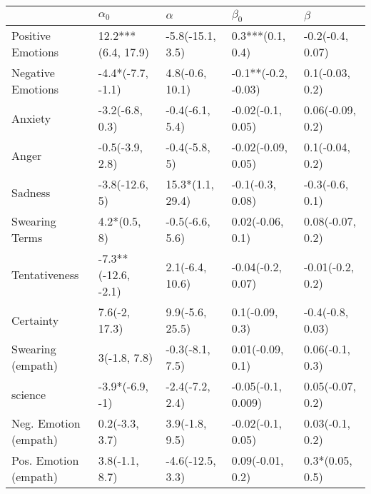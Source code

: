 \begin{tabular}{lllll}
\toprule
{} &           $\alpha_0$ &          $\alpha$ &            $\beta_0$ &           $\beta$ \\
\midrule
Positive Emotions     &   12.2***(6.4, 17.9) &  -5.8(-15.1, 3.5) &     0.3***(0.1, 0.4) &  -0.2(-0.4, 0.07) \\
Negative Emotions     &    -4.4*(-7.7, -1.1) &   4.8(-0.6, 10.1) &  -0.1**(-0.2, -0.03) &   0.1(-0.03, 0.2) \\
Anxiety               &      -3.2(-6.8, 0.3) &   -0.4(-6.1, 5.4) &    -0.02(-0.1, 0.05) &  0.06(-0.09, 0.2) \\
Anger                 &      -0.5(-3.9, 2.8) &     -0.4(-5.8, 5) &   -0.02(-0.09, 0.05) &   0.1(-0.04, 0.2) \\
Sadness               &       -3.8(-12.6, 5) &  15.3*(1.1, 29.4) &     -0.1(-0.3, 0.08) &   -0.3(-0.6, 0.1) \\
Swearing Terms        &         4.2*(0.5, 8) &   -0.5(-6.6, 5.6) &     0.02(-0.06, 0.1) &  0.08(-0.07, 0.2) \\
Tentativeness         &  -7.3**(-12.6, -2.1) &   2.1(-6.4, 10.6) &    -0.04(-0.2, 0.07) &  -0.01(-0.2, 0.2) \\
Certainty             &        7.6(-2, 17.3) &   9.9(-5.6, 25.5) &      0.1(-0.09, 0.3) &  -0.4(-0.8, 0.03) \\
Swearing (empath)     &         3(-1.8, 7.8) &   -0.3(-8.1, 7.5) &     0.01(-0.09, 0.1) &   0.06(-0.1, 0.3) \\
science               &      -3.9*(-6.9, -1) &   -2.4(-7.2, 2.4) &   -0.05(-0.1, 0.009) &  0.05(-0.07, 0.2) \\
Neg. Emotion (empath) &       0.2(-3.3, 3.7) &    3.9(-1.8, 9.5) &    -0.02(-0.1, 0.05) &   0.03(-0.1, 0.2) \\
Pos. Emotion (empath) &       3.8(-1.1, 8.7) &  -4.6(-12.5, 3.3) &     0.09(-0.01, 0.2) &   0.3*(0.05, 0.5) \\
\bottomrule
\end{tabular}
